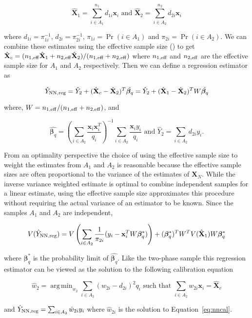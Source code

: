 \documentclass[12pt]{article}
\DeclareMathOperator*{\argmin}{arg\,min}
\renewcommand{\bf}[1]{\mathbf{#1}}
\begin{document}
$$\hat{\bf X}_1 = \sum_{i \in A_1}^{n_1} d_{1i} \bf x_i \text{ and } 
\hat{\bf X}_2 = \sum_{i \in A_2}^{n_2} d_{2i} \bf x_i $$

where $d_{1i} = \pi_{1i}^{-1}$, $d_{2i} = \pi_{2i}^{-1}$, 
$\pi_{1i} = \Pr(i \in A_1)$ and $\pi_{2i} = \Pr(i \in A_2)$. 
We can combine these estimates using the effective sample size 
(\cite{kish1965survey}) to get
$\hat{\bf X}_c = (n_{1, \rm{eff}} \hat{\bf X}_1 + n_{2, \rm{eff}}\hat{\bf X}_2) / 
(n_{1, \rm{eff}} + n_{2, \rm{eff}})$ where $n_{1, \rm{eff}}$ and 
$n_{2, \rm{eff}}$ are the effective sample size for $A_1$ and $A_2$ respectively.
Then we can define a regression estimator as

$$
\hat Y_{\rm NN, reg} = \hat Y_2 + (\hat{\bf X}_c - \hat{\bf X}_2)^T \hat{\bm \beta_q} = 
\hat Y_2 + (\hat{\bf X}_1 - \hat{\bf X}_2)^T W\hat{\bm \beta_q}
$$

where, $W = n_{1, \rm{eff}} / (n_{1, \rm{eff}} + n_{2, \rm{eff}})$, and

$$
\hat{\bm \beta_q} = 
\left(\sum_{i \in A_2} \frac{\bf x_i \bf x_i^T}{q_i}\right)^{-1} 
\sum_{i \in A_2} \frac{\bf x_i y_i}{q_i} \text{ and }
\hat Y_2 = \sum_{i \in A_2} d_{2i} y_i.
$$

From an optimality perspective the choice of using the effective sample size to
weight the estimates from $A_1$ and $A_2$ is reasonable because the
effective sample sizes are often proportional to the variance of the estimates 
of $\bf X_N$. While the inverse variance weighted estimate is optimal
to combine independent samples for a linear estimate, using the effective sample
size approximates this procedure without requiring the actual variance of an
estimator to be known. Since the samples $A_1$ and $A_2$ are independent, 

$$
V(\hat Y_{\rm NN, reg}) = 
V\left(\sum_{i \in A_2} \frac{1}{\pi_{2i}}(y_i - \bf x_i^TW\bm \beta^*_q)\right)
+ (\bm \beta^*_q)^T W^T V(\hat{\bf X}_1) W \bm \beta_q^*
$$

where $\bm \beta_q^*$ is the probability limit of $\hat{\bm \beta_q}$. Like the
two-phase sample this regression estimator can be viewed as the solution to the
following calibration equation 

\begin{equation}\label{eq:nncal}
  \hat w_2 = \argmin_{w_2} \sum_{i \in A_2} (w_{2i} - d_{2i})^2 q_i 
  \text{ such that } \sum_{i \in A_2} w_{2i} \bf x_i = \hat{\bf X}_c
\end{equation}

and $\hat Y_{\rm NN, reg} = \sum_{i \in A_2} \hat w_{2i} y_i$ where $\hat
w_{2i}$ is the solution to Equation~\ref{eq:nncal}.
\end{document}
